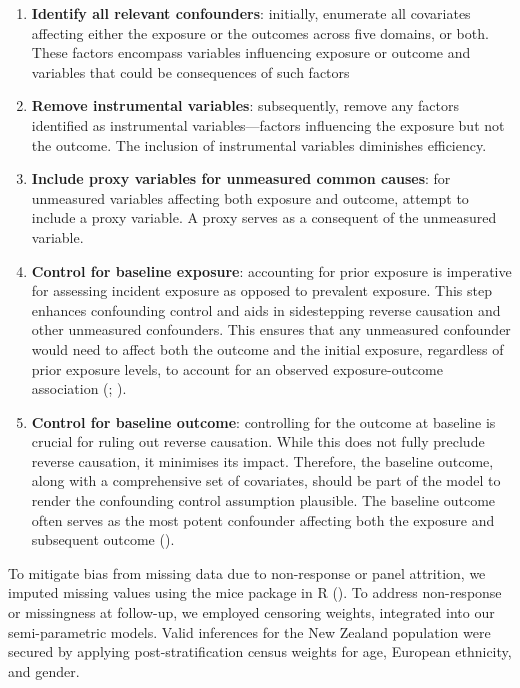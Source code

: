 \documentclass[
  singlecolumn]{article}
\begin{document}
\begin{enumerate}
\def\labelenumi{\arabic{enumi}.}
\item
  \textbf{Identify all relevant confounders}: initially, enumerate all
  covariates affecting either the exposure or the outcomes across five
  domains, or both. These factors encompass variables influencing
  exposure or outcome and variables that could be consequences of such
  factors
\item
  \textbf{Remove instrumental variables}: subsequently, remove any
  factors identified as instrumental variables---factors influencing the
  exposure but not the outcome. The inclusion of instrumental variables
  diminishes efficiency.
\item
  \textbf{Include proxy variables for unmeasured common causes}: for
  unmeasured variables affecting both exposure and outcome, attempt to
  include a proxy variable. A proxy serves as a consequent of the
  unmeasured variable.
\item
  \textbf{Control for baseline exposure}: accounting for prior exposure
  is imperative for assessing incident exposure as opposed to prevalent
  exposure. This step enhances confounding control and aids in
  sidestepping reverse causation and other unmeasured confounders. This
  ensures that any unmeasured confounder would need to affect both the
  outcome and the initial exposure, regardless of prior exposure levels,
  to account for an observed exposure-outcome association
  (;
  ).
\item
  \textbf{Control for baseline outcome}: controlling for the outcome at
  baseline is crucial for ruling out reverse causation. While this does
  not fully preclude reverse causation, it minimises its impact.
  Therefore, the baseline outcome, along with a comprehensive set of
  covariates, should be part of the model to render the confounding
  control assumption plausible. The baseline outcome often serves as the
  most potent confounder affecting both the exposure and subsequent
  outcome ().
\end{enumerate}

To mitigate bias from missing data due to non-response or panel
attrition, we imputed missing values using the mice package in R
(). To address non-response
or missingness at follow-up, we employed censoring weights, integrated
into our semi-parametric models. Valid inferences for the New Zealand
population were secured by applying post-stratification census weights
for age, European ethnicity, and gender.
\end{document}
